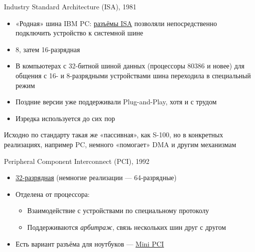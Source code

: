 \documentclass[xetex,aspectratio=43]{beamer}
\begin{document}
\begin{frame}{Industry Standard Architecture (ISA), 1981}
    \begin{itemize}
        \item «Родная» шина IBM PC: \href{https://en.wikipedia.org/wiki/Industry_Standard_Architecture}{разъёмы ISA} позволяли непосредственно подключить устройство к системной шине
        \item 8, затем 16-разрядная
        \item В компьютерах с 32-битной шиной данных (процессоры 80386 и новее) для общения с 16- и 8-разрядными устройствами шина переходила в специальный режим
        \item Поздние версии уже поддерживали Plug-and-Play, хотя и с трудом
        \pause
        \item Изредка используется до сих пор
    \end{itemize}
    \pause
    Исходно по стандарту такая же «пассивная», как S-100, но в конкретных реализациях, например PC, немного «помогает» DMA и другим механизмам
\end{frame}


\begin{frame}{Peripheral Component Interconnect (PCI), 1992}
    \begin{itemize}
        \item \href{https://en.wikipedia.org/wiki/Peripheral_Component_Interconnect}{32-разрядная} (немногие реализации --- 64-разрядные)
        \item \alert<2->{Отделена от процессора:}
        \begin{itemize}
            \item Взаимодействие с устройствами по специальному протоколу
            \item Поддерживаются \emph{арбитраж}, связь нескольких шин друг с другом
        \end{itemize}
    \pause
    \item Есть вариант разъёма для ноутбуков --- \href{https://en.wikipedia.org/wiki/Peripheral\_Component\_Interconnect\#Mini_PCI}{Mini PCI}
    \end{itemize}
\end{frame}
\end{document}
